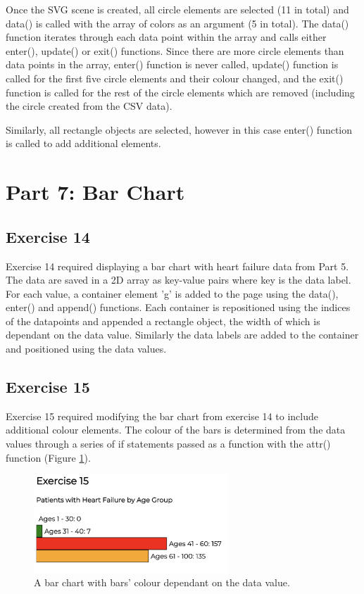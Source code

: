 \documentclass[11pt]{article}   	%
\begin{document}
Once the SVG scene is created, all circle elements are selected (11 in total) and data() is called with the array of colors as an argument (5 in total). The data() function iterates through each data point within the array and calls either enter(), update() or exit() functions. Since there are more circle elements than data points in the array, enter() function is never called, update() function is called for the first five circle elements and their colour changed, and the exit() function is called for the rest of the circle elements which are removed (including the circle created from the CSV data).  

Similarly, all rectangle objects are selected, however in this case enter() function is called to add additional elements.


\section{Part 7: Bar Chart}
\subsection{Exercise 14 }
\vspace{-1em}
Exercise 14 required displaying a bar chart with heart failure data from Part 5. The data are saved in a 2D array as key-value pairs where key is the data label. For each value, a container element 'g' is added to the page using the data(), enter() and append() functions. Each container is repositioned using the indices of the datapoints and appended a rectangle object, the width of which is dependant on the data value. Similarly the data labels are added to the container and positioned using the data values.   

\subsection{Exercise 15 }
\vspace{-1em}
Exercise 15 required modifying the bar chart from exercise 14 to include additional colour elements. The colour of the bars is determined from the data values through a series of if statements passed as a function with the attr() function (Figure \ref{fig:ex15}). 

\begin{figure}[H]
\centering
\includegraphics[width=0.65\textwidth]{data/ex15.png}
\caption{A bar chart with bars' colour dependant on the data value.}
\label{fig:ex15}
\end{figure}
\end{document}
